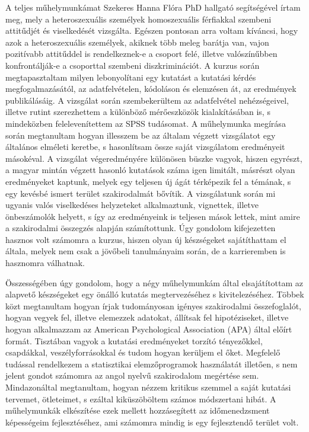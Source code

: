 \par A teljes műhelymunkámat Szekeres Hanna Flóra PhD hallgató segítségével írtam meg, mely a heteroszexuális személyek homoszexuális férfiakkal szembeni attitűdjét és viselkedését vizsgálta. Egészen pontosan arra voltam kíváncsi, hogy azok a heteroszexuális személyek, akiknek több meleg barátja van, vajon pozitívabb attitűddel is rendelkeznek-e a csoport felé, illetve valószínűbben konfrontálják-e a csoporttal szembeni diszkriminációt. A kurzus során megtapasztaltam milyen lebonyolítani egy kutatást a kutatási kérdés megfogalmazásától, az adatfelvételen, kódoláson és elemzésen át, az eredmények publikálásáig. A vizsgálat során szembekerültem az adatfelvétel nehézségeivel, illetve rutint szerezhettem a különböző mérőeszközök kialakításában is, s mindeközben felelevenítettem az SPSS tudásomat. A műhelymunka megírása során megtanultam hogyan illesszem be az általam végzett vizsgálatot egy általános elméleti keretbe, s hasonlítsam össze saját vizsgálatom eredményeit másokéval. A vizsgálat végeredményére különösen büszke vagyok, hiszen egyrészt, a magyar mintán végzett hasonló kutatások száma igen limitált, másrészt olyan eredményeket kaptunk, melyek egy teljesen új ágát térképezik fel a témának, s egy kevésbé ismert terület szakirodalmát bővítik. A vizsgálatunk során mi ugyanis valós viselkedéses helyzeteket alkalmaztunk, vignettek, illetve önbeszámolók helyett, s így az eredményeink is teljesen mások lettek, mint amire a szakirodalmi összegzés alapján számítottunk. Úgy gondolom kifejezetten hasznos volt számomra a kurzus, hiszen olyan új készségeket sajátíthattam el általa, melyek nem csak a jövőbeli tanulmányaim során, de a karrieremben is hasznomra válhatnak.
\\
\par Összességében úgy gondolom, hogy a négy műhelymunkám által elsajátítottam az alapvető készségeket egy önálló kutatás megtervezéséhez s kivitelezéséhez. Többek közt megtanultam hogyan írjak tudományosan igényes szakirodalmi összefoglalót, hogyan vegyek fel, illetve elemezzek adatokat, állítsak fel hipotéziseket, illetve hogyan alkalmazzam az American Psychological Association (APA) által előírt formát. Tisztában vagyok a kutatási eredményeket torzító tényezőkkel, csapdákkal, veszélyforrásokkal és tudom hogyan kerüljem el őket. Megfelelő tudással rendelkezem a statisztikai elemzőprogramok használatát illetően, s nem jelent gondot számomra az angol nyelvű szakirodalom megértése sem. Mindazonáltal megtanultam, hogyan nézzem kritikus szemmel a saját kutatási tervemet, ötleteimet, s ezáltal kiküszöböltem számos módszertani hibát. A műhelymunkák elkészítése ezek mellett hozzásegített az időmenedzsment képességeim fejlesztéséhez, ami számomra mindig is egy fejlesztendő terület volt.

